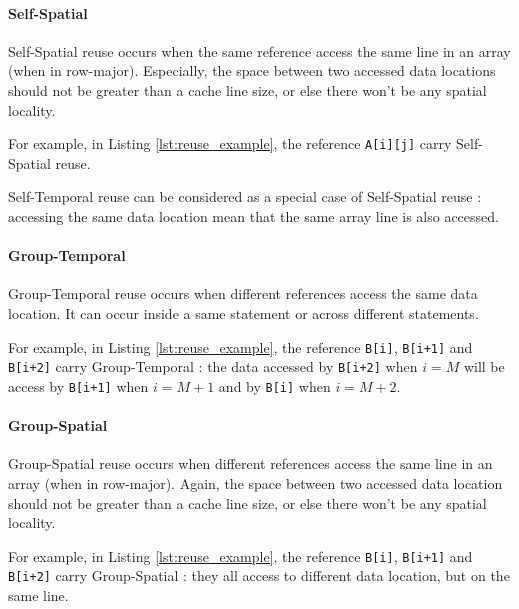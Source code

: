 \documentclass[paper=a4, fontsize=11.5pt]{scrartcl}
\numberwithin{equation}{section}        %
\numberwithin{figure}{section}          %
\numberwithin{table}{section}               %
\begin{document}
            \paragraph{Self-Spatial}
                Self-Spatial reuse occurs when the same reference access the same
                line in an array (when in row-major). Especially, the space between
                two accessed data locations should not be greater than a cache line size,
                or else there won't be any spatial locality.

                For example, in Listing \ref{lst:reuse_example}, the reference \verb'A[i][j]' carry
                Self-Spatial reuse.

                Self-Temporal reuse can be considered as a special case of
                Self-Spatial reuse : accessing the same data location mean that
                the same array line is also accessed.
            \paragraph{Group-Temporal}
                Group-Temporal reuse occurs when different references access the same
                data location. It can occur inside a same statement or across different
                statements.

                For example, in Listing \ref{lst:reuse_example}, the reference
                \verb'B[i]', \verb'B[i+1]' and \verb'B[i+2]' carry Group-Temporal :
                the data accessed by \verb'B[i+2]' when $i=M$ will be access by
                \verb'B[i+1]' when $i=M+1$ and by \verb'B[i]' when $i=M+2$.

            \paragraph{Group-Spatial}
                Group-Spatial reuse occurs when different references access the same
                line in an array (when in row-major). Again, the space between
                two accessed data location should not be greater than a cache line size,
                or else there won't be any spatial locality.
                
                For example, in Listing \ref{lst:reuse_example}, the reference
                \verb'B[i]', \verb'B[i+1]' and \verb'B[i+2]' carry Group-Spatial :
                they all access to different data location, but on the same line.\\
                \\
\end{document}

